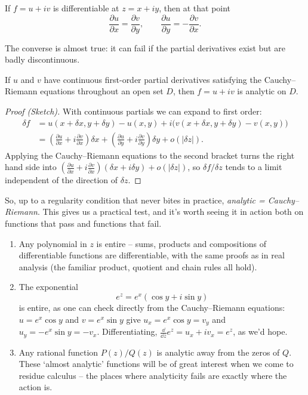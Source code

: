 \documentclass[a4paper]{scrartcl}
\begin{document}
\begin{theorem}
	If $f = u + iv$ is differentiable at $z = x + iy$, then at that point
	$$
	\frac{\partial u}{\partial x} = \frac{\partial v}{\partial y}, \qquad \frac{\partial u}{\partial y} = -\frac{\partial v}{\partial x}.
	$$
\end{theorem}

The converse is almost true: it can fail if the partial derivatives exist but are badly discontinuous.

\begin{theorem}
	If $u$ and $v$ have continuous first-order partial derivatives satisfying the Cauchy--Riemann equations throughout an open set $D$, then $f = u + iv$ is analytic on $D$.
\end{theorem}
\begin{proof}[Proof (Sketch)]
	With continuous partials we can expand to first order:
	\begin{align*}
		\delta f &= u(x + \delta x, y + \delta y) - u(x, y) + i \big( v(x + \delta x, y + \delta y) - v(x, y)\big) \\
		&= \left(\frac{\partial u}{\partial x} + i \frac{\partial v}{\partial x}\right)\delta x + \left(\frac{\partial u}{\partial y} + i \frac{\partial v}{\partial y}\right)\delta y + o(|\delta z|).
	\end{align*}
	Applying the Cauchy--Riemann equations to the second bracket turns the right hand side into $\left(\frac{\partial u}{\partial x} + i \frac{\partial v}{\partial x}\right)(\delta x + i \delta y) + o(|\delta z|)$, so $\delta f/\delta z$ tends to a limit independent of the direction of $\delta z$.
\end{proof}

So, up to a regularity condition that never bites in practice, \emph{analytic = Cauchy--Riemann}. This gives us a practical test, and it's worth seeing it in action both on functions that pass and functions that fail.

\begin{example}
	\begin{enumerate}[label=(\roman*)]
		\item Any polynomial in $z$ is entire -- sums, products and compositions of differentiable functions are differentiable, with the same proofs as in real analysis (the familiar product, quotient and chain rules all hold).
		\item The exponential
		$$
		e^z = e^x(\cos y + i \sin y)
		$$
		is entire, as one can check directly from the Cauchy--Riemann equations: $u = e^x \cos y$ and $v = e^x \sin y$ give $u_x = e^x \cos y = v_y$ and $u_y = -e^x \sin y = -v_x$. Differentiating, $\frac{\dd}{\dd z} e^z = u_x + i v_x = e^z$, as we'd hope.
		\item Any rational function $P(z)/Q(z)$ is analytic away from the zeros of $Q$. These `almost analytic' functions will be of great interest when we come to residue calculus -- the places where analyticity fails are exactly where the action is.
	\end{enumerate}
\end{example}
\end{document}

